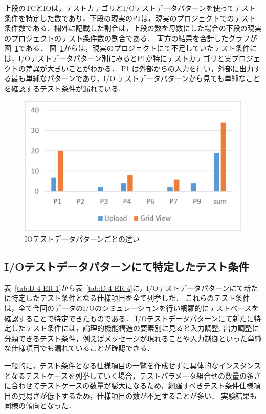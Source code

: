 上段のTCとIOは，テストカテゴリとI/Oテストデータパターンを使ってテスト条件を特定した数であり，下段の現実のPJは，現実のプロジェクトでのテスト条件数である．欄外に記載した割合は，上段の数を母数にした場合の下段の現実のプロジェクトのテスト条件数の割合である．
両方の結果を合計したグラフが図~\ref{fig:D-4-Fig11}である．
図~\ref{fig:D-4-Fig11}からは，現実のプロジェクトにて不足していたテスト条件には，I/Oテストデータパターン別にみるとP1が特にテストカテゴリと実プロジェクトの差異が大きいことがわかる．
P1 は外部からの入力を行い，外部に出力する最も単純なパターンであり，I/O テストデータパターンから見ても単純なことを確認するテスト条件が漏れている.

\begin{figure}[htbp]
\begin{center}
\includegraphics[width=12cm]{./image/D-4-Fig11.png}
\caption{IOテストデータパターンごとの違い}
\label{fig:D-4-Fig11}
\end{center}
\end{figure}

\subsection{I/Oテストデータパターンにて特定したテスト条件}
表~\ref{tab:D-4-ER-1}から表~\ref{tab:D-4-ER-4}に，I/Oテストデータパターンにて新たに特定したテスト条件となる仕様項目を全て列挙した．
これらのテスト条件は，全て今回のデータのI/Oのシミュレーションを行い網羅的にテストベースを確認することで特定できたものである．
I/Oテストデータパターンにて新たに特定したテスト条件には，論理的機能構造の要素別に見ると入力調整, 出力調整に分類できるテスト条件，例えばメッセージが現れることや入力制御といった単純な仕様項目でも漏れていることが確認できる．

一般的に，テスト条件となる仕様項目の一覧を作成せずに具体的なインスタンスとなるテストケースを列挙していく場合，テストパラメータ組合せの数量の多さに合わせてテストケースの数量が膨大になるため，網羅すべきテスト条件仕様項目の見易さが低下するため，仕様項目の数が不足することが多い．
実験結果も同様の傾向となった．


